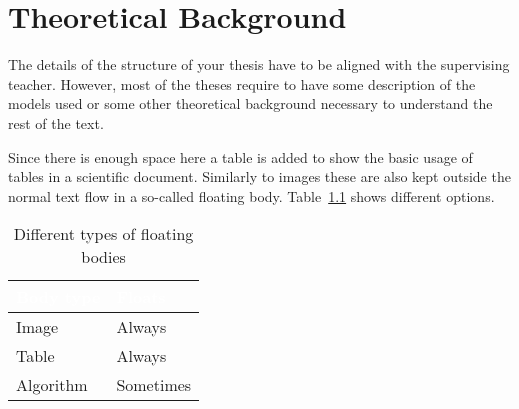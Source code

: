 \chapter{Theoretical Background}\label{cha:theoretical-background}
The details of the structure of your thesis have to be aligned with the supervising teacher. However, most of the theses require to have some description of the models used or some other theoretical background necessary to understand the rest of the text.

Since there is enough space here a table is added to show the basic usage of tables in a scientific document. Similarly to images these are also kept outside the normal text flow in a so-called floating body. Table~\ref{tab:types-of-floating-bodies} shows different options.

\begin{table}
	\begin{center}
	\begin{tabular}{|l|l|}
		\hline
		\cellcolor{Gray}\textcolor{White}{Body type} & \cellcolor{Gray}\textcolor{White}{Floats} \\
		\hline
		Image & Always \\
		\hline
		Table & Always \\
		\hline
		Algorithm & Sometimes \\
		\hline
	\end{tabular}
	\end{center}
	\caption{Different types of floating bodies}
	\label{tab:types-of-floating-bodies}
\end{table}